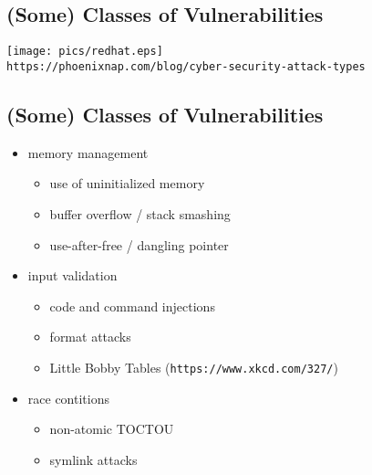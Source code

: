 \documentclass[xga]{xdvislides}
\begin{document}
\subsection{(Some) Classes of Vulnerabilities}
\vspace*{\fill}
\begin{center}
	\texttt{[image: pics/redhat.eps]} \\
	\vspace{.25in}
	\verb+https://phoenixnap.com/blog/cyber-security-attack-types+
\end{center}
\vspace*{\fill}

\subsection{(Some) Classes of Vulnerabilities}
\Normalsize
\begin{itemize}
	\item memory management
		\begin{itemize}
			\item use of uninitialized memory
			\item buffer overflow / stack smashing
			\item use-after-free / dangling pointer
		\end{itemize}
	\item input validation
		\begin{itemize}
			\item code and command injections
			\item format attacks
			\item Little Bobby Tables ({\tt https://www.xkcd.com/327/})
		\end{itemize}
	\item race contitions
		\begin{itemize}
			\item non-atomic TOCTOU
			\item symlink attacks
		\end{itemize}
\end{itemize}
\end{document}
